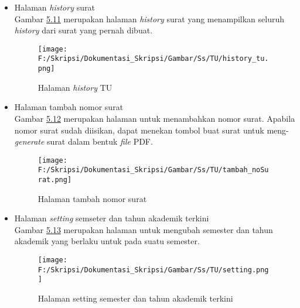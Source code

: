 \begin{itemize}
	\item Halaman \textit{history} surat\\
	 Gambar \hyperlink{halaman_history_tu}{5.11} merupakan halaman \textit{history} surat yang menampilkan seluruh \textit{history} dari surat yang pernah dibuat.
	 \begin{figure}[H]
	\centering
		\texttt{[image: F:/Skripsi/Dokumentasi\_Skripsi/Gambar/Ss/TU/history\_tu.png]}
		\caption{Halaman \textit{history} TU}
		\label{fig:halaman_history_tu}
	\end{figure}
	
	\item Halaman tambah nomor surat\\
	 Gambar \hyperlink{halaman_tambah_nomor_surat}{5.12} merupakan halaman untuk menambahkan nomor surat. Apabila nomor surat sudah diisikan, dapat menekan tombol buat surat untuk meng-\textit{generate} surat dalam bentuk \textit{file} PDF.
	 \begin{figure}[H]
	\centering
		\texttt{[image: F:/Skripsi/Dokumentasi\_Skripsi/Gambar/Ss/TU/tambah\_noSurat.png]}
		\caption{Halaman tambah nomor surat}
		\label{fig:halaman_tambah_nomor_surat}
	\end{figure}
	
	\item Halaman \textit{setting} semseter dan tahun akademik terkini\\
	 Gambar \hyperlink{halaman_setting_semester_dan_tahun_akademik_terkini}{5.13} merupakan halaman untuk mengubah semester dan tahun akademik yang berlaku untuk pada suatu semester.
	 \begin{figure}[H]
	\centering
		\texttt{[image: F:/Skripsi/Dokumentasi\_Skripsi/Gambar/Ss/TU/setting.png]}
		\caption{Halaman setting semester dan tahun akademik terkini}
		\label{fig:halaman_setting_semester_dan_tahun_akademik_terkini}
	\end{figure}
\end{itemize}
	
